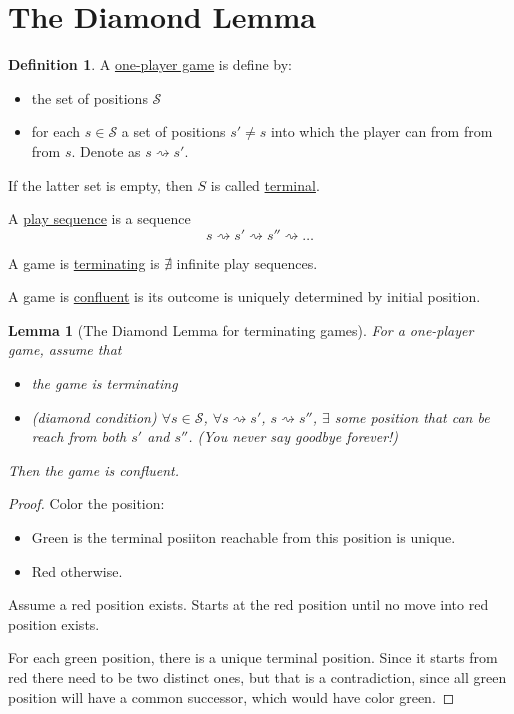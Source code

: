 \documentclass{report}
\newtheorem{lemma}{Lemma}[section]
\theoremstyle{definition}
\newtheorem{definition}{Definition}[section]
\theoremstyle{remark}
\numberwithin{equation}{section}
\begin{document}
\section{The Diamond Lemma}
\begin{definition}
    A \underline{one-player game} is define by:
    \begin{itemize}
        \item the set of positions $\mathcal{S}$
        \item for each $s \in \mathcal{S}$ a set of positions $s' \neq s$ into which the player can from from from $s$. Denote as $s \rightsquigarrow s'$.
    \end{itemize}
    If the latter set is empty, then $S$ is called \underline{terminal}.

    A \underline{play sequence} is a sequence
    \[s \rightsquigarrow s' \rightsquigarrow s'' \rightsquigarrow \ldots\]

    A game is \underline{terminating} is $\nexists$ infinite play sequences.

    A game is \underline{confluent} is its outcome is uniquely determined by initial position.
\end{definition}

\begin{lemma}[The Diamond Lemma for terminating games]
    For a one-player game, assume that
    \begin{itemize}
        \item the game is terminating
        \item[$\diamond$](diamond condition) $\forall s \in \mathcal{S}$, $\forall s \rightsquigarrow s'$, $s \rightsquigarrow s''$, $\exists$ some position that can be reach from both $s'$ and $s''$. (You never say goodbye forever!)
    \end{itemize}
    Then the game is confluent.
\end{lemma}
\begin{proof}
    Color the position:
    \begin{itemize}
        \item[\textcolor{green}\textbullet] Green is the terminal posiiton reachable from this position is unique.
        \item[\textcolor{red}\textbullet] Red otherwise.
    \end{itemize}
    Assume a red position exists. Starts at the red position until no move into red position exists. 

    For each green position, there is a unique terminal position. Since it starts from red there need to be two distinct ones, but that is a contradiction, since all green position will have a common successor, which would have color green.
\end{proof}
\end{document}
